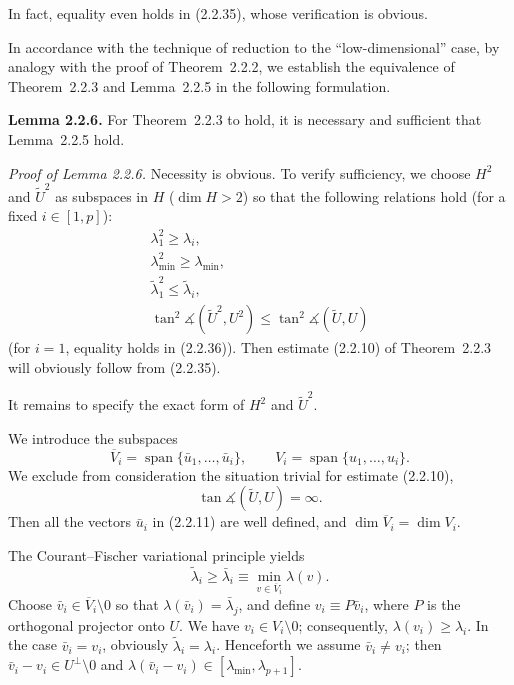 \documentclass[11pt,oneside]{book}
\newcommand{\myspan}{\operatorname{span}}
\newcommand{\ang}{\measuredangle}
\begin{document}
In fact, equality even holds in (2.2.35), whose verification is obvious.

In accordance with the technique of reduction to the ``low-dimensional'' case, by analogy with the proof of Theorem~2.2.2, we establish the equivalence of Theorem~2.2.3 and Lemma~2.2.5 in the following formulation.

\textbf{Lemma 2.2.6.} For Theorem~2.2.3 to hold, it is necessary and sufficient that Lemma~2.2.5 hold.

\textit{Proof of Lemma 2.2.6.} Necessity is obvious. To verify sufficiency, we choose $H^2$ and $\widetilde{U}^2$ as subspaces in $H$ ($\dim H > 2$) so that the following relations hold (for a fixed $i \in [1, p]$):
\begin{gather*}
\lambda_1^2 \geqslant \lambda_i, \tag{2.2.36} \\
\lambda_{\min}^2 \geqslant \lambda_{\min}, \tag{2.2.37} \\
\tilde{\lambda}_1^2 \leqslant \tilde{\lambda}_i, \tag{2.2.38} \\
\tan^2 \ang(\widetilde{U}^2, U^2) \leqslant \tan^2 \ang(\widetilde{U}, U) \tag{2.2.39}
\end{gather*}
(for $i = 1$, equality holds in (2.2.36)). Then estimate (2.2.10) of Theorem~2.2.3 will obviously follow from (2.2.35).

It remains to specify the exact form of $H^2$ and $\widetilde{U}^2$.

We introduce the subspaces
\[
\overline{V}_i = \myspan\{\bar{u}_1, \ldots, \bar{u}_i\}, \qquad V_i = \myspan\{u_1, \ldots, u_i\}. \tag{2.2.40}
\]
We exclude from consideration the situation trivial for estimate (2.2.10),
\[
\tan \ang(\widetilde{U}, U) = \infty.
\]
Then all the vectors $\bar{u}_i$ in (2.2.11) are well defined, and $\dim \overline{V}_i = \dim V_i$.

The Courant--Fischer variational principle yields
\[
\tilde{\lambda}_i \geqslant \bar{\lambda}_i \equiv \min_{v \in \overline{V}_i} \lambda(v).
\]
Choose $\bar{v}_i \in \overline{V}_i \setminus 0$ so that $\lambda(\bar{v}_i) = \bar{\lambda}_j$, and %
define $v_i \equiv P\bar{v}_i$, where $P$ is the orthogonal projector onto $U$. We have $v_i \in V_i \setminus 0$; consequently, $\lambda(v_i) \geqslant \lambda_i$. In the case $\bar{v}_i = v_i$, obviously $\tilde{\lambda}_i = \lambda_i$. Henceforth we assume $\bar{v}_i \neq v_i$; then $\bar{v}_i - v_i \in U^\perp \setminus 0$ and $\lambda(\bar{v}_i - v_i) \in [\lambda_{\min}, \lambda_{p+1}]$.
\end{document}

